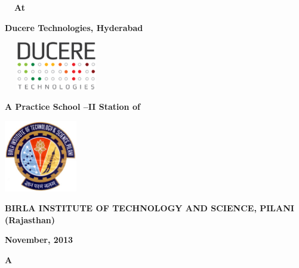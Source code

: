 \bigskip

{\centering{}\bfseries
\ \ At
\par}


\bigskip


\bigskip

{\centering{}\bfseries
Ducere Technologies, Hyderabad
\par}

{\centering 
\includegraphics[width=4.575cm,height=2.124cm]{logo.png}
\par}

\bigskip

{\centering{}\bfseries
A Practice School --II Station of
\par}


\bigskip

{\centering 
\includegraphics[width=3.175cm,height=3.124cm]{formatreport-img1.jpg}
\par}


\bigskip

{\centering{}\bfseries
BIRLA INSTITUTE OF TECHNOLOGY AND SCIENCE, PILANI
(Rajasthan)
\par}


\bigskip

{\centering{}\bfseries
November, 2013
\par}


\bigskip


\bigskip


\bigskip


\bigskip


\bigskip


\bigskip


\bigskip


\bigskip


\bigskip
\newpage
{\centering{}\bfseries
A
\par}

